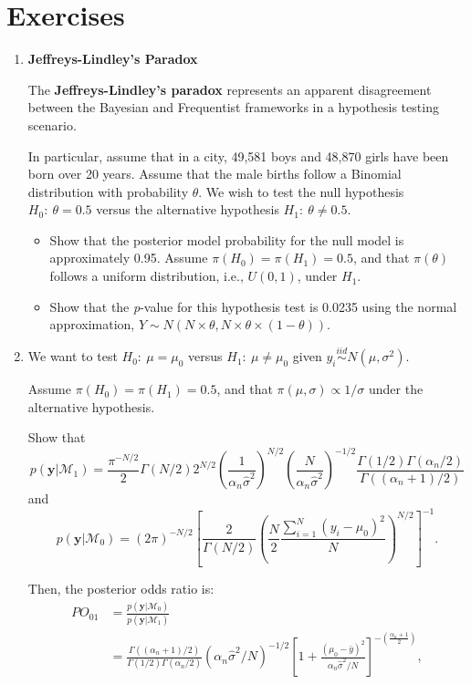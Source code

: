 \section{Exercises}\label{sec28}
\begin{enumerate}
	\item \textbf{Jeffreys-Lindley's Paradox}
	
	The \textbf{Jeffreys-Lindley's paradox} \cite{Jeffreys1961,lindley1957statistical} represents an apparent disagreement between the Bayesian and Frequentist frameworks in a hypothesis testing scenario.
	
	In particular, assume that in a city, 49,581 boys and 48,870 girls have been born over 20 years. Assume that the male births follow a Binomial distribution with probability $\theta$. We wish to test the null hypothesis $H_0: \ \theta = 0.5$ versus the alternative hypothesis $H_1: \ \theta \neq 0.5$.
	
	\begin{itemize}
		\item Show that the posterior model probability for the null model is approximately 0.95. Assume $\pi(H_0) = \pi(H_1) = 0.5$, and that $\pi(\theta)$ follows a uniform distribution, i.e., ${U}(0,1)$, under $H_1$.
		\item Show that the \textit{p}-value for this hypothesis test is 0.0235 using the normal approximation, $Y \sim N(N \times \theta, N \times \theta \times (1 - \theta))$.
	\end{itemize}
	
	\item We want to test $H_0: \ \mu = \mu_0$ versus $H_1: \ \mu \neq \mu_0$ given $y_i \stackrel{iid}{\sim} N(\mu, \sigma^2)$.
	
	Assume $\pi(H_0) = \pi(H_1) = 0.5$, and that $\pi(\mu, \sigma) \propto 1/\sigma$ under the alternative hypothesis.
	
	Show that	
	\[
	p(\mathbf{y}|\mathcal{M}_1) = \frac{\pi^{-N/2}}{2} \Gamma(N/2) 2^{N/2} \left( \frac{1}{\alpha_n \hat{\sigma}^2} \right)^{N/2} \left( \frac{N}{\alpha_n \hat{\sigma}^2} \right)^{-1/2} \frac{\Gamma(1/2) \Gamma(\alpha_n/2)}{\Gamma((\alpha_n+1)/2)}
	\]
	and 
	\[
	p(\mathbf{y}|\mathcal{M}_0) = (2\pi)^{-N/2} \left[ \frac{2}{\Gamma(N/2)} \left( \frac{N}{2} \frac{\sum_{i=1}^N (y_i - \mu_0)^2}{N} \right)^{N/2} \right]^{-1}.
	\]
	
	Then, the posterior odds ratio is:	
	\begin{align*}
		PO_{01} &= \frac{p(\mathbf{y}|\mathcal{M}_0)}{p(\mathbf{y}|\mathcal{M}_1)} \\
		&= \frac{\Gamma((\alpha_n+1)/2)}{\Gamma(1/2)\Gamma(\alpha_n/2)} (\alpha_n \hat{\sigma}^2 / N)^{-1/2} \left[ 1 + \frac{(\mu_0 - \bar{y})^2}{\alpha_n \hat{\sigma}^2 / N} \right]^{-\left(\frac{\alpha_n + 1}{2}\right)},
	\end{align*}
	

\end{enumerate}
